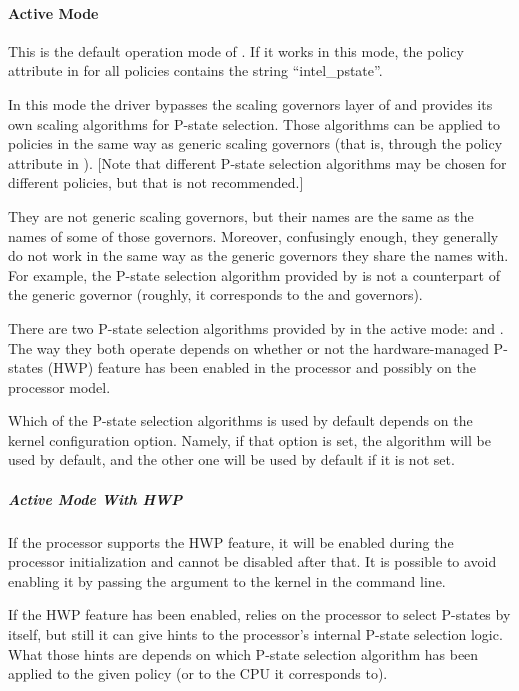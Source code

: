 \documentclass[a4paper,8pt,english]{sphinxmanual}
\begin{document}
\paragraph{Active Mode}
\label{admin-guide/pm/intel_pstate:active-mode}
This is the default operation mode of .  If it works in this
mode, the  policy attribute in  for all 
policies contains the string ``intel\_pstate''.

In this mode the driver bypasses the scaling governors layer of  and
provides its own scaling algorithms for P-state selection.  Those algorithms
can be applied to  policies in the same way as generic scaling
governors (that is, through the  policy attribute in
).  {[}Note that different P-state selection algorithms may be chosen for
different policies, but that is not recommended.{]}

They are not generic scaling governors, but their names are the same as the
names of some of those governors.  Moreover, confusingly enough, they generally
do not work in the same way as the generic governors they share the names with.
For example, the  P-state selection algorithm provided by
 is not a counterpart of the generic  governor
(roughly, it corresponds to the  and  governors).

There are two P-state selection algorithms provided by  in the
active mode:  and .  The way they both operate
depends on whether or not the hardware-managed P-states (HWP) feature has been
enabled in the processor and possibly on the processor model.

Which of the P-state selection algorithms is used by default depends on the
 kernel configuration option.
Namely, if that option is set, the  algorithm will be used by
default, and the other one will be used by default if it is not set.


\subparagraph{Active Mode With HWP}
\label{admin-guide/pm/intel_pstate:active-mode-with-hwp}
If the processor supports the HWP feature, it will be enabled during the
processor initialization and cannot be disabled after that.  It is possible
to avoid enabling it by passing the  argument to the
kernel in the command line.

If the HWP feature has been enabled,  relies on the processor to
select P-states by itself, but still it can give hints to the processor's
internal P-state selection logic.  What those hints are depends on which P-state
selection algorithm has been applied to the given policy (or to the CPU it
corresponds to).
\end{document}
